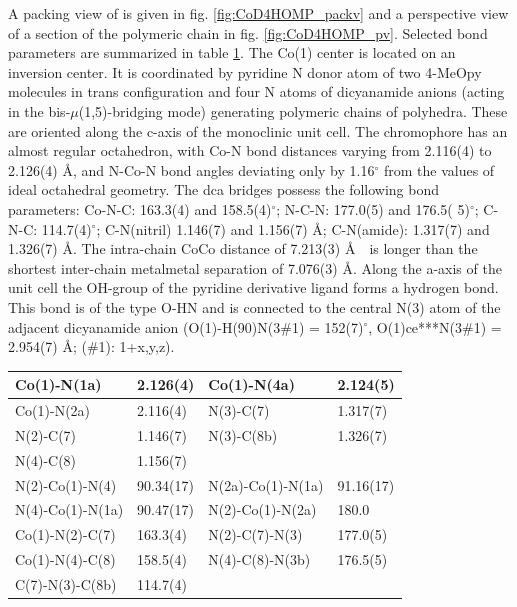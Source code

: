 A packing view  of  is given in fig. \ref{fig:CoD4HOMP_packv} and a perspective view of a section of the polymeric chain  in fig. \ref{fig:CoD4HOMP_pv}. Selected bond parameters are summarized in table \ref{batab:CoD4HOMP}.  The Co(1) center is located on an inversion center. It is coordinated by pyridine N donor atom of two 4-MeOpy molecules in trans configuration and four N atoms of dicyanamide anions (acting in the bis-$\mu$(1,5)-bridging mode) generating polymeric chains of polyhedra. These are oriented along the c-axis of the monoclinic unit cell. The  chromophore has an almost regular octahedron, with Co-N bond distances varying from 2.116(4) to 2.126(4) \AA, and N-Co-N bond angles deviating only by 1.16$^\circ$ from the values of ideal octahedral geometry. The dca bridges possess the following bond parameters: Co-N-C: 163.3(4) and 158.5(4)$^\circ$; N-C-N: 177.0(5) and 176.5(
5)$^\circ$; C-N-C: 114.7(4)$^\circ$; C-N(nitril) 1.146(7) and 1.156(7) \AA; C-N(amide): 1.317(7) and 1.326(7) \AA. The intra-chain Co\ce{***}Co distance of 7.213(3) \AA\ \ is longer than the shortest inter-chain metal\ce{***}metal separation of 7.076(3) \AA. Along the a-axis of the unit cell the OH-group of the pyridine derivative ligand forms a hydrogen bond. This bond is  of  the type O-H\ce{***}N and is connected to the central N(3) atom of the adjacent dicyanamide anion (O(1)-H(90)\ce{***}N(3\#1) = 152(7)$^\circ$, O(1)ce{***}N(3\#1) = 2.954(7) \AA; (\#1): 1+x,y,z).



\renewcommand{\arraystretch}{1.2}
\begin{table}[htpb!]
\centering
{}
\begin{tabular}{|l|l|l|l|}
\hline
Co(1)-N(1a) & 2.126(4) & Co(1)-N(4a) & 2.124(5)\\
\hline
Co(1)-N(2a) & 2.116(4) & N(3)-C(7) & 1.317(7)\\
\hline
N(2)-C(7) & 1.146(7) & N(3)-C(8b) & 1.326(7)\\
\hline
N(4)-C(8) & 1.156(7) &  & \\
\hline
\hline
N(2)-Co(1)-N(4) & 90.34(17) & N(2a)-Co(1)-N(1a) & 91.16(17) \\
\hline
N(4)-Co(1)-N(1a) & 90.47(17) & N(2)-Co(1)-N(2a) & 180.0\\
\hline
Co(1)-N(2)-C(7) & 163.3(4) & N(2)-C(7)-N(3) & 177.0(5)\\
\hline
Co(1)-N(4)-C(8) & 158.5(4) & N(4)-C(8)-N(3b) & 176.5(5)\\
\hline
C(7)-N(3)-C(8b) & 114.7(4) &  & \\
\hline
\end{tabular}
\label{batab:CoD4HOMP}
\end{table}

